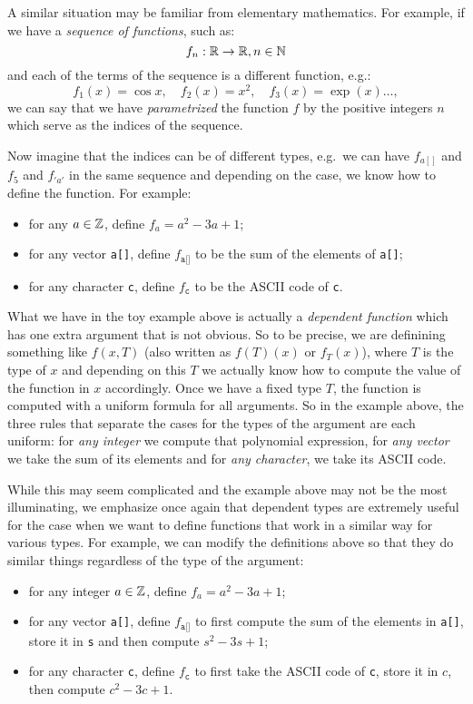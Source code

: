 A similar situation may be familiar from elementary mathematics. For example,
if we have a \emph{sequence of functions}, such as:
\[
  f_n : \mathbb{R} \to \mathbb{R}, n \in \mathbb{N}
\]
and each of the terms of the sequence is a different function, e.g.:
\[
  f_1(x) = \cos x, \quad f_2(x) = x^2, \quad f_3(x) = \exp(x) \dots,
\]
we can say that we have \emph{parametrized} the function $ f $ by
the positive integers $ n $ which serve as the indices of the sequence.

Now imagine that the indices can be of different types, e.g.\ we can
have $ f_{a[]} $ and $ f_5 $ and $ f_{'a'} $ in the same sequence and depending
on the case, we know how to define the function. For example:
\begin{itemize}
\item for any $ a \in \mathbb{Z} $, define $ f_a = a^2 - 3a + 1 $;
\item for any vector \texttt{a[]}, define $ f_{\texttt{a[]}} $ to be the sum
  of the elements of \texttt{a[]};
\item for any character \texttt{c}, define $ f_{\texttt{c}} $ to be the ASCII code
  of \texttt{c}.
\end{itemize}

What we have  in the toy example above is actually a
\emph{dependent function} which has one extra argument that is not obvious.
So to be precise, we are definining something like $ f(x, T) $
(also written as $ f(T)(x) $ or $ f_T(x) $), where $ T $ is the type of $ x $
and depending on this $ T $ we actually know how to compute the value
of the function in $ x $ accordingly. Once we have a fixed type $ T $,
the function is computed with a uniform formula for all arguments.
So in the example above, the three rules that separate the cases for the
types of the argument are each uniform: for \emph{any integer} we compute
that polynomial expression, for \emph{any vector} we take the sum of
its elements and for \emph{any character}, we take its ASCII code.

While this may seem complicated and the example above may not be the most
illuminating, we emphasize once again that dependent types are extremely
useful for the case when we want to define functions that work in a similar
way for various types. For example, we can modify the definitions above
so that they do similar things regardless of the type of the argument:
\begin{itemize}
\item for any integer $ a \in \mathbb{Z} $, define $ f_a = a^2 - 3a + 1 $;
\item for any vector \texttt{a[]}, define $ f_{\texttt{a[]}} $ to first compute
  the sum of the elements in \texttt{a[]}, store it in \texttt{s}
  and then compute $ s^2 - 3s + 1 $;
\item for any character \texttt{c}, define $ f_{\texttt{c}} $ to first take the
  ASCII code of \texttt{c}, store it in $ c $, then compute
  $ c^2 - 3c + 1 $.
\end{itemize}


